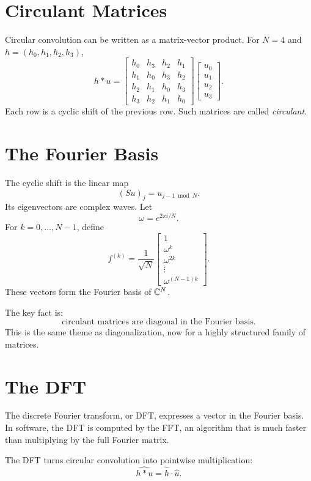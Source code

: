 \section{Circulant Matrices}

Circular convolution can be written as a matrix-vector product. For
$N=4$ and $h=(h_0,h_1,h_2,h_3)$,
\[
  h*u =
  \begin{bmatrix}
  h_0&h_3&h_2&h_1\\
  h_1&h_0&h_3&h_2\\
  h_2&h_1&h_0&h_3\\
  h_3&h_2&h_1&h_0
  \end{bmatrix}
  \begin{bmatrix}u_0\\u_1\\u_2\\u_3\end{bmatrix}.
\]
Each row is a cyclic shift of the previous row. Such matrices are called
\emph{circulant}.

\section{The Fourier Basis}

The cyclic shift is the linear map
\[
  (Su)_j=u_{j-1\bmod N}.
\]
Its eigenvectors are complex waves. Let
\[
  \omega=e^{2\pi i/N}.
\]
For $k=0,\ldots,N-1$, define
\[
  f^{(k)}=
  \frac{1}{\sqrt{N}}
  \begin{bmatrix}
  1\\
  \omega^k\\
  \omega^{2k}\\
  \vdots\\
  \omega^{(N-1)k}
  \end{bmatrix}.
\]
These vectors form the Fourier basis of $\mathbb{C}^N$.

The key fact is:
\[
  \text{circulant matrices are diagonal in the Fourier basis.}
\]
This is the same theme as diagonalization, now for a highly structured family
of matrices.

\section{The DFT}

The discrete Fourier transform, or DFT, expresses a vector in the Fourier
basis. In software, the DFT is computed by the FFT, an algorithm that is much
faster than multiplying by the full Fourier matrix.

\begin{theorem}
The DFT turns circular convolution into pointwise multiplication:
\[
  \widehat{h*u}=\hat{h}\cdot \hat{u}.
\]
\end{theorem}


